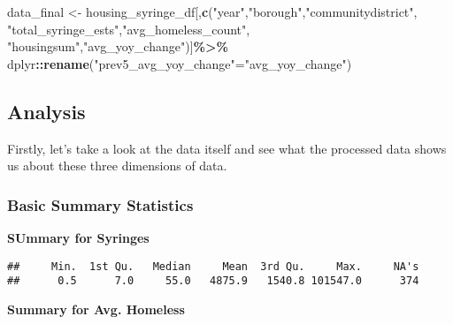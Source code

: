 \documentclass[
]{article}
\newenvironment{Shaded}{\begin{snugshade}}{\end{snugshade}}
\newcommand{\FunctionTok}[1]{\textcolor[rgb]{0.13,0.29,0.53}{\textbf{#1}}}
\newcommand{\NormalTok}[1]{#1}
\newcommand{\OtherTok}[1]{\textcolor[rgb]{0.56,0.35,0.01}{#1}}
\newcommand{\SpecialCharTok}[1]{\textcolor[rgb]{0.81,0.36,0.00}{\textbf{#1}}}
\newcommand{\StringTok}[1]{\textcolor[rgb]{0.31,0.60,0.02}{#1}}
\begin{document}
\begin{Shaded}
\begin{Highlighting}[]
\NormalTok{data\_final }\OtherTok{\textless{}{-}}\NormalTok{ housing\_syringe\_df[,}\FunctionTok{c}\NormalTok{(}\StringTok{"year"}\NormalTok{,}\StringTok{"borough"}\NormalTok{,}\StringTok{"communitydistrict"}\NormalTok{,}
                                    \StringTok{"total\_syringe\_ests"}\NormalTok{,}\StringTok{"avg\_homeless\_count"}\NormalTok{,}
                                    \StringTok{"housingsum"}\NormalTok{,}\StringTok{"avg\_yoy\_change"}\NormalTok{)]}\SpecialCharTok{\%\textgreater{}\%}
\NormalTok{  dplyr}\SpecialCharTok{::}\FunctionTok{rename}\NormalTok{(}\StringTok{"prev5\_avg\_yoy\_change"}\OtherTok{=}\StringTok{"avg\_yoy\_change"}\NormalTok{)}
\end{Highlighting}
\end{Shaded}

\subsection{Analysis}\label{analysis}

Firstly, let's take a look at the data itself and see what the processed
data shows us about these three dimensions of data.

\subsubsection{Basic Summary Statistics}\label{basic-summary-statistics}

\textbf{SUmmary for Syringes}

\begin{Shaded}
\end{Shaded}

\begin{verbatim}
##     Min.  1st Qu.   Median     Mean  3rd Qu.     Max.     NA's 
##      0.5      7.0     55.0   4875.9   1540.8 101547.0      374
\end{verbatim}

\textbf{Summary for Avg. Homeless}

\begin{Shaded}
\end{Shaded}
\end{document}
